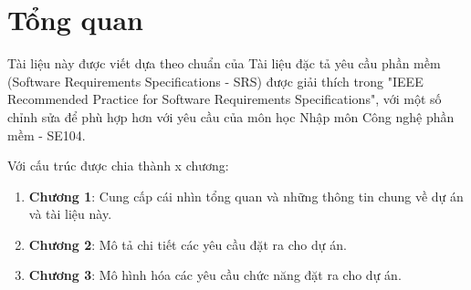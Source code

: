 \section{Tổng quan}
Tài liệu này được viết dựa theo chuẩn của Tài liệu đặc tả yêu cầu phần mềm (Software
Requirements Specifications - SRS) được giải thích trong "IEEE Recommended Practice
for Software Requirements Specifications", với một số chỉnh sửa để phù hợp hơn với yêu cầu của môn học Nhập môn Công nghệ phần mềm - SE104.

Với cấu trúc được chia thành x chương:
\begin{enumerate}
    \item \textbf{Chương 1}: Cung cấp cái nhìn tổng quan và những thông tin chung về dự án và tài liệu này.
    \item \textbf{Chương 2}: Mô tả chi tiết các yêu cầu đặt ra cho dự án.
    \item \textbf{Chương 3}: Mô hình hóa các yêu cầu chức năng đặt ra cho dự án.
\end{enumerate}